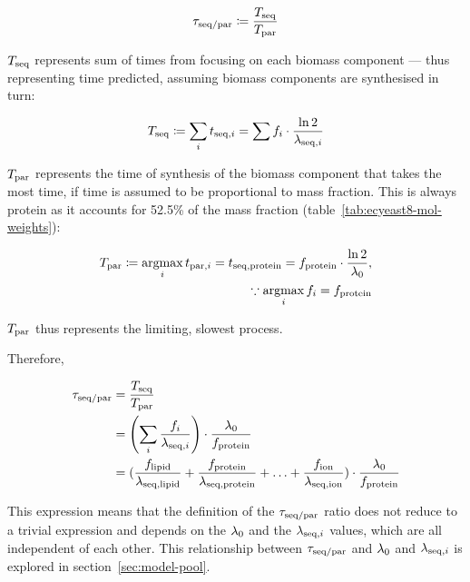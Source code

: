 \begin{equation}
  \tau_{\mathrm{seq}/\mathrm{par}} \coloneqq \frac{T_{\mathrm{seq}}}{T_{\mathrm{par}}}
  \label{eq:model-ratio-simplified}
\end{equation}

$T_{\mathrm{seq}}$ represents sum of times from focusing on each biomass component --- thus representing time predicted, assuming biomass components are synthesised in turn:

\begin{equation}
  T_{\mathrm{seq}} \coloneqq \sum_{i} t_{\mathrm{seq},i} = \sum f_{i} \cdot \frac{\ln 2}{\lambda_{\mathrm{seq},i}}
  \label{eq:model-a}
\end{equation}

$T_{\mathrm{par}}$ represents the time of synthesis of the biomass component that takes the most time, if time is assumed to be proportional to mass fraction.
This is always protein as it accounts for 52.5\% of the mass fraction (table~\ref{tab:ecyeast8-mol-weights}):

\begin{equation}
  \begin{aligned}
    T_{\mathrm{par}} \coloneqq \operatorname*{argmax}_{i} t_{\mathrm{par},i} = t_{\mathrm{seq},\mathrm{protein}} = f_{\mathrm{protein}} \cdot \frac{\ln 2}{\lambda_{0}},\\
    \because \operatorname*{argmax}_{i} f_{i} = f_{\mathrm{protein}}
  \end{aligned}
  \label{eq:model-b}
\end{equation}

$T_{\mathrm{par}}$ thus represents the limiting, slowest process.

Therefore,

\begin{equation}
  \begin{aligned}
    \tau_{\mathrm{seq}/\mathrm{par}} &= \frac{T_{\mathrm{seq}}}{T_{\mathrm{par}}} \\
    & = \left( \sum_i \frac{f_i}{\lambda_{\mathrm{seq},i}} \right) \cdot \frac{\lambda_{0}}{f_{\mathrm{protein}}} \\
    & = (\frac{f_{\mathrm{lipid}}}{\lambda_{\mathrm{seq},\mathrm{lipid}}} + \frac{f_{\mathrm{protein}}}{\lambda_{\mathrm{seq},\mathrm{protein}}} + \ldots + \frac{f_{\mathrm{ion}}}{\lambda_{\mathrm{seq},\mathrm{ion}}}) \cdot \frac{\lambda_{0}}{f_{\mathrm{protein}}}
    \end{aligned}
  \label{eq:model-ratio}
\end{equation}

This expression means that the definition of the $\tau_{\mathrm{seq}/\mathrm{par}}$ ratio does not reduce to a trivial expression and depends on the $\lambda_{0}$ and the $\lambda_{\mathrm{seq},i}$ values, which are all independent of each other.
This relationship between $\tau_{\mathrm{seq}/\mathrm{par}}$ and $\lambda_{0}$ and $\lambda_{\mathrm{seq},i}$ is explored in section~\ref{sec:model-pool}.

